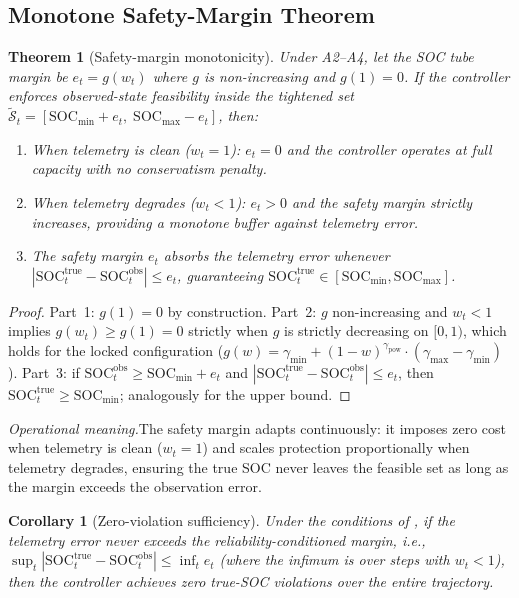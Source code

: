\documentclass[11pt,a4paper]{article}
\newtheorem{theorem}{Theorem}
\newtheorem{corollary}{Corollary}
\begin{document}
\subsection{Monotone Safety-Margin Theorem}

\begin{theorem}[Safety-margin monotonicity]\label{thm:safety_margin}
Under A2--A4, let the SOC tube margin be $e_t = g(w_t)$ where $g$ is non-increasing and $g(1)=0$. If the controller enforces observed-state feasibility inside the tightened set $\tilde{\mathcal{S}}_t = [\mathrm{SOC}_{\min} + e_t,\; \mathrm{SOC}_{\max} - e_t]$, then:
\begin{enumerate}[leftmargin=*,topsep=2pt,itemsep=1pt]
  \item When telemetry is clean ($w_t = 1$): $e_t = 0$ and the controller operates at full capacity with no conservatism penalty.
  \item When telemetry degrades ($w_t < 1$): $e_t > 0$ and the safety margin strictly increases, providing a monotone buffer against telemetry error.
  \item The safety margin $e_t$ absorbs the telemetry error whenever $|\mathrm{SOC}^{\mathrm{true}}_t - \mathrm{SOC}^{\mathrm{obs}}_t| \le e_t$, guaranteeing $\mathrm{SOC}^{\mathrm{true}}_t \in [\mathrm{SOC}_{\min}, \mathrm{SOC}_{\max}]$.
\end{enumerate}
\end{theorem}
\begin{proof}
Part~1: $g(1)=0$ by construction. Part~2: $g$ non-increasing and $w_t < 1$ implies $g(w_t) \ge g(1) = 0$ strictly when $g$ is strictly decreasing on $[0,1)$, which holds for the locked configuration ($g(w) = \gamma_{\min} + (1-w)^{\gamma_{\mathrm{pow}}} \cdot (\gamma_{\max}-\gamma_{\min})$). Part~3: if $\mathrm{SOC}^{\mathrm{obs}}_t \ge \mathrm{SOC}_{\min}+e_t$ and $|\mathrm{SOC}^{\mathrm{true}}_t - \mathrm{SOC}^{\mathrm{obs}}_t| \le e_t$, then $\mathrm{SOC}^{\mathrm{true}}_t \ge \mathrm{SOC}_{\min}$; analogously for the upper bound.
\end{proof}

\noindent\textit{Operational meaning.}\enspace The safety margin adapts continuously: it imposes zero cost when telemetry is clean ($w_t = 1$) and scales protection proportionally when telemetry degrades, ensuring the true SOC never leaves the feasible set as long as the margin exceeds the observation error.

\begin{corollary}[Zero-violation sufficiency]\label{cor:zero_violation}
Under the conditions of , if the telemetry error never exceeds the reliability-conditioned margin, i.e., $\sup_t |\mathrm{SOC}^{\mathrm{true}}_t - \mathrm{SOC}^{\mathrm{obs}}_t| \le \inf_t e_t$ (where the infimum is over steps with $w_t < 1$), then the controller achieves zero true-SOC violations over the entire trajectory.
\end{corollary}
\end{document}
